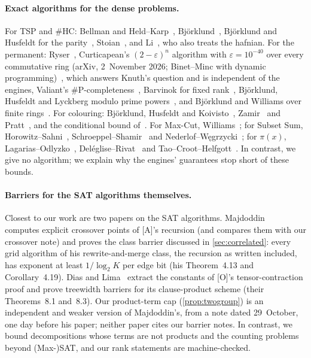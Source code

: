 \documentclass[10pt]{amsart}
\theoremstyle{plain}
\theoremstyle{definition}
\theoremstyle{remark}
\numberwithin{equation}{section}
\newcommand{\A}{\textup{[A]}}
\newcommand{\Oa}{\textup{[O]}}
\begin{document}
\paragraph{Exact algorithms for the dense problems.} For TSP and $\#$HC: Bellman and Held--Karp~\cite{Bellman62,HeldKarp62},
Bj\"orklund~\cite{Bjorklund14,Bjorklund16}, Bj\"orklund and Husfeldt for the parity~\cite{BjorklundHusfeldt13},
Stoian~\cite{Stoian24}, and Li~\cite{Li26}, who also treats the hafnian. For the permanent: Ryser~\cite{Ryser63}, Curticapean's $(2-\varepsilon)^n$ algorithm with $\varepsilon=10^{-40}$ over every
commutative ring (arXiv, 2~November 2026; Binet--Minc with dynamic programming)~\cite{Curticapean26}, which answers Knuth's question and is
independent of the engines,
Valiant's $\#$P-completeness~\cite{Valiant79b}, Barvinok for fixed rank~\cite{Barvinok96}, Bj\"orklund,
Husfeldt and Lyckberg modulo prime powers~\cite{BHL17}, and Bj\"orklund and Williams over finite
rings~\cite{BjorklundWilliams19}. For colouring: Bj\"orklund, Husfeldt and Koivisto~\cite{BHK09},
Zamir~\cite{Zamir26} and Pratt~\cite{Pratt26}, and the conditional bound of~\cite{BCHKP25}. For Max-Cut,
Williams~\cite{Williams05}; for Subset Sum, Horowitz--Sahni~\cite{HorowitzSahni74},
Schroeppel--Shamir~\cite{SchroeppelShamir81} and Nederlof--W\k{e}grzycki~\cite{NederlofWegrzycki21}; for
$\pi(x)$, Lagarias--Odlyzko~\cite{LO87}, Del\'eglise--Rivat~\cite{DR96} and Tao--Croot--Helfgott~\cite{TCH12}.
In contrast, we give no algorithm; we explain why the engines' guarantees stop short of these bounds.

\paragraph{Barriers for the SAT algorithms themselves.} Closest to our work are two papers on the
SAT algorithms. Majdoddin~\cite{Maj26} computes explicit crossover points of \A's recursion (and compares
them with our crossover note) and proves the class barrier discussed in \cref{sec:correlated}: every grid
algorithm of his rewrite-and-merge class, the recursion as written included, has exponent at least
$1/\log_2K$ per edge bit (his Theorem~4.13 and Corollary~4.19). Dias and Lima~\cite{DL26} extract the
constants of \Oa's tensor-contraction proof and prove treewidth barriers for its clause-product scheme
(their Theorems~8.1 and~8.3). Our product-term cap (\cref{prop:twogroup}) is an independent and weaker
version of Majdoddin's, from a note dated 29~October, one day before his paper; neither paper cites our
barrier notes. In contrast, we bound decompositions whose terms are not products and the counting
problems beyond (Max-)SAT, and our rank statements are machine-checked.
\end{document}
